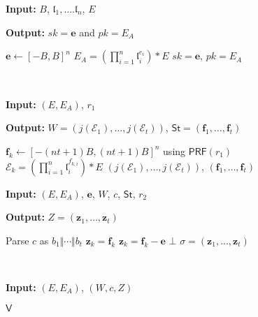 \documentclass{llncs}
\newcommand{\E}{\mathcal{E}}
\renewcommand{\l}{\mathfrak{l}}
\newcommand{\e}{\mathbf{e}}
\newcommand{\f}{\mathbf{f}}
\newcommand{\z}{\mathbf{z}}
\newcommand{\IGen}{\mathsf{IGen}}
\newcommand{\PP}{\mathsf{P}}
\newcommand{\VV}{\mathsf{V}}
\newcommand{\St}{\textsf{St}}
\newcommand{\PRF}{\mathsf{PRF}}
\begin{document}
\begin{figure}
\begin{minipage}{.45\textwidth}
\begin{algorithm}[H]
	\caption{$\IGen$}
	\textbf{Input:} $B$, $\l_1, \dots. \l_n$, $E$

	\textbf{Output:} $sk =\e$ and $pk = E_A$

	\begin{algorithmic}[1]
		\State $\e \leftarrow [-B,B]^n$ 
		\State $E_A = ( \prod_{i=1}^n \l_i^{e_i} ) * E$
		\State \Return $sk= \e$, $pk = E_A$
	\end{algorithmic}
\end{algorithm}
\end{minipage}
 \ \ \ \ \ \ \ \ \ \ \ \ 
\begin{minipage}{0.45\textwidth}
\begin{algorithm}[H]
	\caption{$\PP_1$}
	\textbf{Input:} $(E,E_A)$,  $r_1$

	\textbf{Output:} $W = ( j(\E_1) , \dots, j(\E_t) )$, $\St = (\f_1, \dots, \f_t )$

	\begin{algorithmic}[1]
		\State $\f_k \leftarrow [-(nt+1)B,(nt+1)B]^n$ using $\PRF( r_1 )$
		\State $\E_k = ( \prod_{i=1}^n \l_i^{f_{k,i}} ) * E$
		\EndFor
		\State \Return $( j(\E_1) , \dots, j(\E_t) )$, $(\f_1, \dots, \f_t )$
	\end{algorithmic}
\end{algorithm}
\end{minipage}



\begin{minipage}{0.45\textwidth}
\begin{algorithm}[H]
	\caption{$\PP_2$}
	\textbf{Input:} $(E,E_A)$, $\e$, $W$, $c$, $\St$, $r_2$

	\textbf{Output:} $Z = (\z_1, \dots, \z_t)$

	\begin{algorithmic}[1]
		\State Parse $c$ as $b_1 \Vert \cdots \Vert b_t$
		\State $\z_k = \f_k$
		\Else
		\State $\z_k = \f_k - \e$
		\EndIf
		\If{$\z_{k} \not\in [-ntB,ntB]^n$} \State \Return $\bot$ \EndIf
		\EndFor
		\State \Return $\sigma = (\z_1, \dots, \z_t)$
	\end{algorithmic}
\end{algorithm}
\end{minipage}
 \ \ \ \ \ \ \ \ \ \ \ \ 
\begin{minipage}{0.45\textwidth}
\begin{algorithm}[H]
	\caption{$\VV$}
	\textbf{Input:} $(E,E_A)$, $(W,c,Z)$


\end{algorithm}
\end{minipage}
\end{figure}
\end{document}
